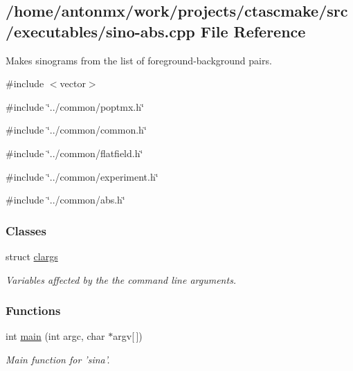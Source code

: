 \hypertarget{sino-abs_8cpp}{
\subsection{/home/antonmx/work/projects/ctascmake/src/executables/sino-\/abs.cpp File Reference}
\label{sino-abs_8cpp}
}


Makes sinograms from the list of foreground-\/background pairs.  


{\ttfamily \#include $<$vector$>$}\par
{\ttfamily \#include \char`\"{}../common/poptmx.h\char`\"{}}\par
{\ttfamily \#include \char`\"{}../common/common.h\char`\"{}}\par
{\ttfamily \#include \char`\"{}../common/flatfield.h\char`\"{}}\par
{\ttfamily \#include \char`\"{}../common/experiment.h\char`\"{}}\par
{\ttfamily \#include \char`\"{}../common/abs.h\char`\"{}}\par
\subsubsection*{Classes}
\begin{DoxyCompactItemize}
\item 
struct \hyperlink{structclargs}{clargs}
\begin{DoxyCompactList}\small\item\em Variables affected by the the command line arguments. \item\end{DoxyCompactList}\end{DoxyCompactItemize}
\subsubsection*{Functions}
\begin{DoxyCompactItemize}
\item 
int \hyperlink{sino-abs_8cpp_a0ddf1224851353fc92bfbff6f499fa97}{main} (int argc, char $\ast$argv\mbox{[}$\,$\mbox{]})
\begin{DoxyCompactList}\small\item\em Main function for 'sina'. \item\end{DoxyCompactList}\end{DoxyCompactItemize}


